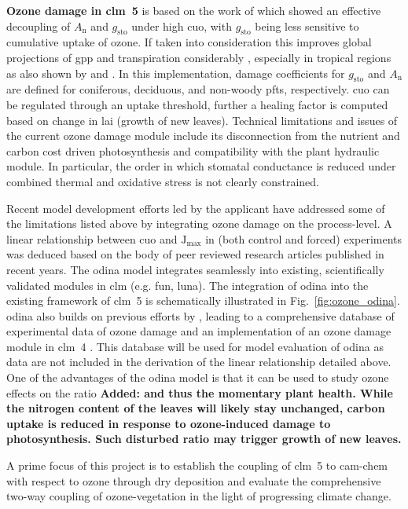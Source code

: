 \textbf{Ozone damage in \gls{clm}~5} is based on the work of \textcite{Oe:Lombardozzi2012} which showed an effective decoupling of $A_\mathrm{n}$ and $g_\mathrm{sto}$ under high \gls{cuo}, with $g_\mathrm{sto}$ being less sensitive to cumulative uptake of ozone. If taken into consideration this improves global projections of \gls{gpp} and transpiration considerably \parencite{BGS:Lombardozzi2012}, especially in tropical regions as also shown by \textcite{Nat:Sitch2007} and \textcite{ACP:Pacifico2015}. In this implementation, damage coefficients for $g_\mathrm{sto}$ and $A_\mathrm{n}$ are defined for coniferous, deciduous, and non-woody \glspl{pft}, respectively. \gls{cuo} can be regulated through an uptake threshold, further a healing factor is computed based on change in \gls{lai} (growth of new leaves). Technical limitations and issues of the current ozone damage module include its disconnection from the nutrient and carbon cost driven photosynthesis and compatibility with the plant hydraulic module. In particular, the order in which stomatal conductance is reduced under combined thermal and oxidative stress is not clearly constrained.

Recent model development efforts led by the applicant have addressed some of the limitations listed above by integrating ozone damage on the process-level. A linear relationship between \gls{cuo} and $\mathrm{J_{max}}$ in (both control and forced) experiments was deduced based on the body of peer reviewed research articles published in recent years. The \gls{odina} model integrates seamlessly into existing, scientifically validated modules in \gls{clm} (e.g. \gls{fun}, \gls{luna}). The integration of \gls{odina} into the existing framework of \gls{clm}~5 is schematically illustrated in Fig.~\ref{fig:ozone_odina}. \gls{odina} also builds on previous efforts by \textcites{BGS:Lombardozzi2012}{Oe:Lombardozzi2012}, leading to a comprehensive database of experimental data of ozone damage and an implementation of an ozone damage module in \gls{clm}~4 \parencite{BGS:Lombardozzi2013}. This database will be used for model evaluation of \gls{odina} as data are not included in the derivation of the linear relationship detailed above. One of the advantages of the \gls{odina} model is that it can be used to study ozone effects on the  ratio  \textbf{\color{blue}Added: and thus the momentary plant health. While the nitrogen content of the leaves will likely stay unchanged, carbon uptake is reduced in response to ozone-induced damage to photosynthesis. Such disturbed  ratio may trigger growth of new leaves.}

A prime focus of this project is to establish the coupling of \gls{clm}~5 to \gls{cam}-chem with respect to ozone through dry deposition and evaluate the comprehensive two-way coupling of ozone-vegetation in the light of progressing climate change.
